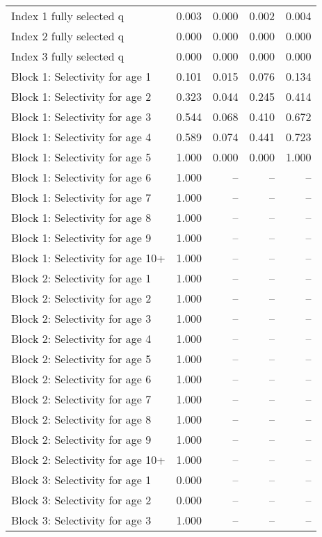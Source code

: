 \documentclass[
]{article}
\begin{document}
\begin{landscape}
\begin{longtable}[t]{lrrrr}
\endfoot
\bottomrule
\endlastfoot
Index 1 fully selected q & 0.003 & 0.000 & 0.002 & 0.004\\
Index 2 fully selected q & 0.000 & 0.000 & 0.000 & 0.000\\
Index 3 fully selected q & 0.000 & 0.000 & 0.000 & 0.000\\
Block 1: Selectivity for age 1 & 0.101 & 0.015 & 0.076 & 0.134\\
Block 1: Selectivity for age 2 & 0.323 & 0.044 & 0.245 & 0.414\\
\addlinespace
Block 1: Selectivity for age 3 & 0.544 & 0.068 & 0.410 & 0.672\\
Block 1: Selectivity for age 4 & 0.589 & 0.074 & 0.441 & 0.723\\
Block 1: Selectivity for age 5 & 1.000 & 0.000 & 0.000 & 1.000\\
Block 1: Selectivity for age 6 & 1.000 & -- & -- & --\\
Block 1: Selectivity for age 7 & 1.000 & -- & -- & --\\
\addlinespace
Block 1: Selectivity for age 8 & 1.000 & -- & -- & --\\
Block 1: Selectivity for age 9 & 1.000 & -- & -- & --\\
Block 1: Selectivity for age 10+ & 1.000 & -- & -- & --\\
Block 2: Selectivity for age 1 & 1.000 & -- & -- & --\\
Block 2: Selectivity for age 2 & 1.000 & -- & -- & --\\
\addlinespace
Block 2: Selectivity for age 3 & 1.000 & -- & -- & --\\
Block 2: Selectivity for age 4 & 1.000 & -- & -- & --\\
Block 2: Selectivity for age 5 & 1.000 & -- & -- & --\\
Block 2: Selectivity for age 6 & 1.000 & -- & -- & --\\
Block 2: Selectivity for age 7 & 1.000 & -- & -- & --\\
\addlinespace
Block 2: Selectivity for age 8 & 1.000 & -- & -- & --\\
Block 2: Selectivity for age 9 & 1.000 & -- & -- & --\\
Block 2: Selectivity for age 10+ & 1.000 & -- & -- & --\\
Block 3: Selectivity for age 1 & 0.000 & -- & -- & --\\
Block 3: Selectivity for age 2 & 0.000 & -- & -- & --\\
\addlinespace
Block 3: Selectivity for age 3 & 1.000 & -- & -- & --\\

\end{longtable}
\end{landscape}
\end{document}

